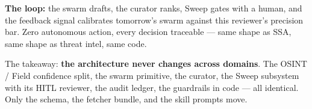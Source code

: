 \textbf{The loop:} the swarm drafts, the curator ranks, Sweep gates with a human, and the feedback signal calibrates tomorrow's swarm against this reviewer's precision bar. Zero autonomous action, every decision traceable --- same shape as SSA, same shape as threat intel, same code.

The takeaway: \textbf{the architecture never changes across domains}. The OSINT / Field confidence split, the swarm primitive, the curator, the Sweep subsystem with its HITL reviewer, the audit ledger, the guardrails in code --- all identical. Only the schema, the fetcher bundle, and the skill prompts move.



